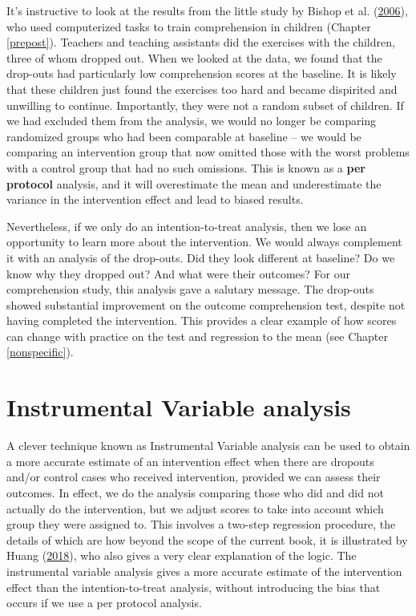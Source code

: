 \documentclass{krantz}
\begin{document}
It's instructive to look at the results from the little study by Bishop et al. (\protect\hyperlink{ref-bishop2006}{2006}), who used computerized tasks to train comprehension in children (Chapter \ref{prepost}). Teachers and teaching assistants did the exercises with the children, three of whom dropped out. When we looked at the data, we found that the drop-outs had particularly low comprehension scores at the baseline. It is likely that these children just found the exercises too hard and became dispirited and unwilling to continue. Importantly, they were not a random subset of children. If we had excluded them from the analysis, we would no longer be comparing randomized groups who had been comparable at baseline -- we would be comparing an intervention group that now omitted those with the worst problems with a control group that had no such omissions. This is known as a \textbf{per protocol} analysis, and it will overestimate the mean and underestimate the variance in the intervention effect and lead to biased results.

Nevertheless, if we only do an intention-to-treat analysis, then we lose an opportunity to learn more about the intervention. We would always complement it with an analysis of the drop-outs. Did they look different at baseline? Do we know why they dropped out? And what were their outcomes? For our comprehension study, this analysis gave a salutary message. The drop-outs showed substantial improvement on the outcome comprehension test, despite not having completed the intervention. This provides a clear example of how scores can change with practice on the test and regression to the mean (see Chapter \ref{nonspecific}).

\hypertarget{instrumental-variable-analysis}{%
\section{Instrumental Variable analysis}\label{instrumental-variable-analysis}}

A clever technique known as Instrumental Variable analysis can be used to obtain a more accurate estimate of an intervention effect when there are dropouts and/or control cases who received intervention, provided we can assess their outcomes. In effect, we do the analysis comparing those who did and did not actually do the intervention, but we adjust scores to take into account which group they were assigned to. This involves a two-step regression procedure, the details of which are how beyond the scope of the current book, it is illustrated by Huang (\protect\hyperlink{ref-huang2018}{2018}), who also gives a very clear explanation of the logic. The instrumental variable analysis gives a more accurate estimate of the intervention effect than the intention-to-treat analysis, without introducing the bias that occurs if we use a per protocol analysis.
\end{document}
